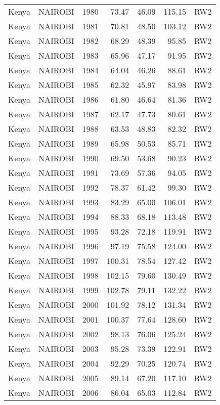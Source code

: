 \begin{longtable}{lllrrrl}
  Kenya & NAIROBI & 1980 & 73.47 & 46.09 & 115.15 & RW2 \\ 
  Kenya & NAIROBI & 1981 & 70.81 & 48.50 & 103.12 & RW2 \\ 
  Kenya & NAIROBI & 1982 & 68.29 & 48.39 & 95.85 & RW2 \\ 
  Kenya & NAIROBI & 1983 & 65.96 & 47.17 & 91.95 & RW2 \\ 
  Kenya & NAIROBI & 1984 & 64.04 & 46.26 & 88.61 & RW2 \\ 
  Kenya & NAIROBI & 1985 & 62.32 & 45.97 & 83.98 & RW2 \\ 
  Kenya & NAIROBI & 1986 & 61.80 & 46.64 & 81.36 & RW2 \\ 
  Kenya & NAIROBI & 1987 & 62.17 & 47.73 & 80.61 & RW2 \\ 
  Kenya & NAIROBI & 1988 & 63.53 & 48.83 & 82.32 & RW2 \\ 
  Kenya & NAIROBI & 1989 & 65.98 & 50.53 & 85.71 & RW2 \\ 
  Kenya & NAIROBI & 1990 & 69.50 & 53.68 & 90.23 & RW2 \\ 
  Kenya & NAIROBI & 1991 & 73.69 & 57.36 & 94.05 & RW2 \\ 
  Kenya & NAIROBI & 1992 & 78.37 & 61.42 & 99.30 & RW2 \\ 
  Kenya & NAIROBI & 1993 & 83.29 & 65.00 & 106.01 & RW2 \\ 
  Kenya & NAIROBI & 1994 & 88.33 & 68.18 & 113.48 & RW2 \\ 
  Kenya & NAIROBI & 1995 & 93.28 & 72.18 & 119.91 & RW2 \\ 
  Kenya & NAIROBI & 1996 & 97.19 & 75.58 & 124.00 & RW2 \\ 
  Kenya & NAIROBI & 1997 & 100.31 & 78.54 & 127.42 & RW2 \\ 
  Kenya & NAIROBI & 1998 & 102.15 & 79.60 & 130.49 & RW2 \\ 
  Kenya & NAIROBI & 1999 & 102.78 & 79.11 & 132.22 & RW2 \\ 
  Kenya & NAIROBI & 2000 & 101.92 & 78.12 & 131.34 & RW2 \\ 
  Kenya & NAIROBI & 2001 & 100.37 & 77.64 & 128.60 & RW2 \\ 
  Kenya & NAIROBI & 2002 & 98.13 & 76.06 & 125.24 & RW2 \\ 
  Kenya & NAIROBI & 2003 & 95.28 & 73.39 & 122.91 & RW2 \\ 
  Kenya & NAIROBI & 2004 & 92.29 & 70.25 & 120.74 & RW2 \\ 
  Kenya & NAIROBI & 2005 & 89.14 & 67.20 & 117.10 & RW2 \\ 
  Kenya & NAIROBI & 2006 & 86.04 & 65.03 & 112.84 & RW2 \\ 

\end{longtable}
